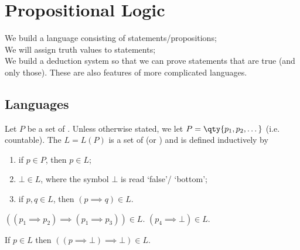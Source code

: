 \section{Propositional Logic}

We build a language consisting of statements/propositions; \\
We will assign truth values to statements; \\
We build a deduction system so that we can prove statements that are true (and only those).
These are also features of more complicated languages.

\subsection{Languages}

Let $P$ be a set of .
Unless otherwise stated, we let $P = \qty{p_1, p_2, \dots}$ (i.e. countable).
The  $L = L(P)$ is a set of  (or ) and is defined inductively by
\begin{enumerate}
    \item if $p \in P$, then $p \in L$;
    \item $\bot \in L$, where the symbol $\bot$ is read `false'/ `bottom';
    \item if $p, q \in L$, then $(p \implies q) \in L$.
\end{enumerate}

\begin{example}
    $((p_1 \implies p_2) \implies (p_1 \implies p_3)) \in L$.
    $(p_4 \implies \bot) \in L$.

    If $p \in L$ then $((p \implies \bot) \implies \bot) \in L$.
\end{example}

